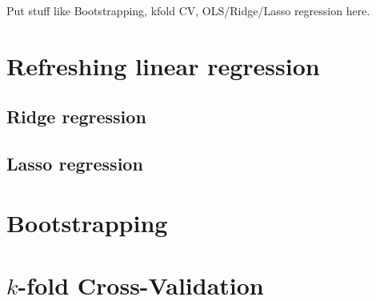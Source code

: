 \begin{appendices}
Put stuff like Bootstrapping, kfold CV, OLS/Ridge/Lasso regression here.

\section{Refreshing linear regression}
\subsection{Ridge regression}
\subsection{Lasso regression}

\section{Bootstrapping}
\section{\texorpdfstring{$k$}{k}-fold Cross-Validation}
\end{appendices}